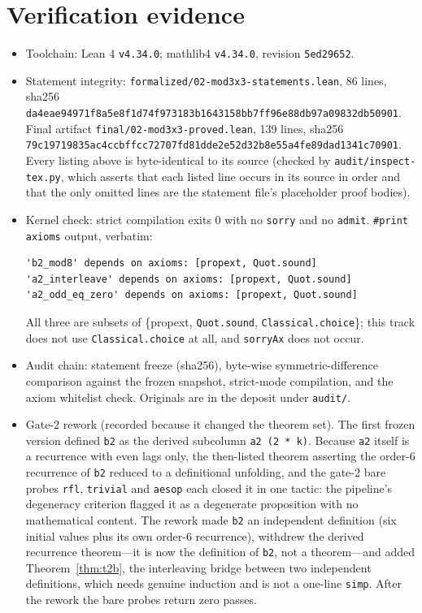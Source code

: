 \documentclass[11pt]{article}
\begin{document}
\section{Verification evidence}
\label{sec:verif}
\begin{itemize}
\item Toolchain: Lean 4 \texttt{v4.34.0}; mathlib4 \texttt{v4.34.0}, revision \texttt{5ed29652}.
\item Statement integrity: \texttt{formalized/02-mod3x3-statements.lean}, 86 lines,
sha256 \texttt{da4eae94971f8a5e8f1d74f973183b1643158bb7ff96e88db97a09832db50901}.
Final artifact \texttt{final/02-mod3x3-proved.lean}, 139 lines,
sha256 \texttt{79c19719835ac4ccbffcc72707fd81dde2e52d32b8e55a4fe89dad1341c70901}.
Every listing above is byte-identical to its source (checked by \texttt{audit/inspect-tex.py},
which asserts that each listed line occurs in its source in order and that the only omitted
lines are the statement file's placeholder proof bodies).
\item Kernel check: strict compilation exits 0 with no \texttt{sorry} and no \texttt{admit}.
\texttt{\#print axioms} output, verbatim:
\begin{verbatim}
'b2_mod8' depends on axioms: [propext, Quot.sound]
'a2_interleave' depends on axioms: [propext, Quot.sound]
'a2_odd_eq_zero' depends on axioms: [propext, Quot.sound]
\end{verbatim}
All three are subsets of \{propext, \texttt{Quot.sound}, \texttt{Classical.choice}\}; this
track does not use \texttt{Classical.choice} at all, and \texttt{sorryAx} does not occur.
\item Audit chain: statement freeze (sha256), byte-wise symmetric-difference comparison against
the frozen snapshot, strict-mode compilation, and the axiom whitelist check. Originals are in
the deposit under \texttt{audit/}.
\item Gate-2 rework (recorded because it changed the theorem set). The first frozen version
defined \texttt{b2} as the derived subcolumn \texttt{a2 (2 * k)}. Because \texttt{a2} itself
is a recurrence with even lags only, the then-listed theorem asserting the order-6
recurrence of \texttt{b2} reduced to a definitional unfolding, and the gate-2 bare probes
\texttt{rfl}, \texttt{trivial} and \texttt{aesop} each closed it in one tactic: the pipeline's
degeneracy criterion flagged it as a degenerate proposition with no mathematical content.
The rework made \texttt{b2} an independent definition (six initial values plus its own
order-6 recurrence), withdrew the derived recurrence theorem---it is now the definition of
\texttt{b2}, not a theorem---and added Theorem~\ref{thm:t2b}, the interleaving bridge between
two independent definitions, which needs genuine induction and is not a one-line
\texttt{simp}. After the rework the bare probes return zero passes.
\end{itemize}
\end{document}
